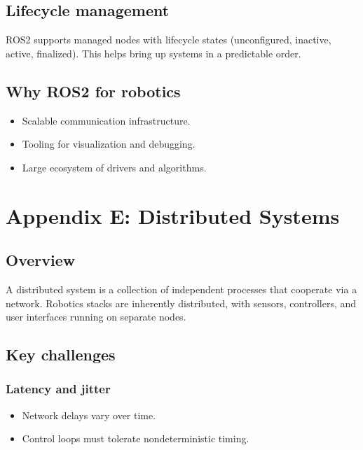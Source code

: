 \documentclass[letterpaper,10pt,english]{sphinxmanual}
\begin{document}
\section{Lifecycle management}
\label{\detokenize{appendix_d_ros2_overview:lifecycle-management}}
\sphinxAtStartPar
ROS2 supports managed nodes with lifecycle states (unconfigured, inactive,
active, finalized). This helps bring up systems in a predictable order.


\section{Why ROS2 for robotics}
\label{\detokenize{appendix_d_ros2_overview:why-ros2-for-robotics}}\begin{itemize}
\item {} 
\sphinxAtStartPar
Scalable communication infrastructure.

\item {} 
\sphinxAtStartPar
Tooling for visualization and debugging.

\item {} 
\sphinxAtStartPar
Large ecosystem of drivers and algorithms.

\end{itemize}


\chapter{Appendix E: Distributed Systems}
\label{\detokenize{appendix_e_distributed_systems:appendix-e-distributed-systems}}\label{\detokenize{appendix_e_distributed_systems::doc}}

\section{Overview}
\label{\detokenize{appendix_e_distributed_systems:overview}}
\sphinxAtStartPar
A distributed system is a collection of independent processes that cooperate
via a network. Robotics stacks are inherently distributed, with sensors,
controllers, and user interfaces running on separate nodes.


\section{Key challenges}
\label{\detokenize{appendix_e_distributed_systems:key-challenges}}

\subsection{Latency and jitter}
\label{\detokenize{appendix_e_distributed_systems:latency-and-jitter}}\begin{itemize}
\item {} 
\sphinxAtStartPar
Network delays vary over time.

\item {} 
\sphinxAtStartPar
Control loops must tolerate nondeterministic timing.

\end{itemize}
\end{document}
